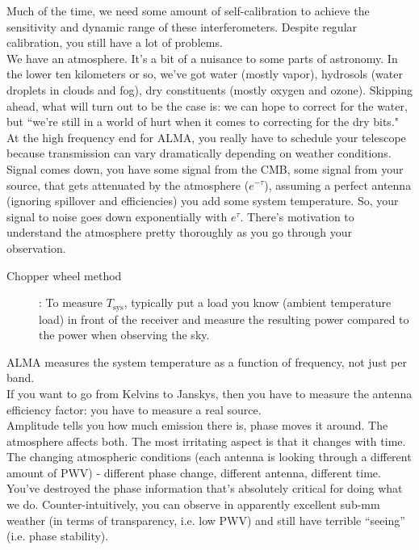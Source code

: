 \documentclass[a4paper]{article}
\begin{document}
Much of the time, we need some amount of self-calibration to achieve the sensitivity and dynamic range of these interferometers. Despite regular calibration, you still have a lot of problems. \\

We have an atmosphere. It's a bit of a nuisance to some parts of astronomy. In the lower ten kilometers or so, we've got water (mostly vapor), hydrosols (water droplets in clouds and fog), dry constituents (mostly oxygen and ozone). Skipping ahead, what will turn out to be the case is: we can hope to correct for the water, but ``we're still in a world of hurt when it comes to correcting for the dry bits." \\

At the high frequency end for ALMA, you really have to schedule your telescope because transmission can vary dramatically depending on weather conditions. \\

Signal comes down, you have some signal from the CMB, some signal from your source, that gets attenuated by the atmosphere ($e^{-\tau}$), assuming a perfect antenna (ignoring spillover and efficiencies) you add some system temperature. So, your signal to noise goes down exponentially with $e^{\tau}$. There's motivation to understand the atmosphere pretty thoroughly as you go through your observation. 

\begin{description}
\item[Chopper wheel method]: To measure $T_\mathrm{sys}$, typically put a load you know (ambient temperature load) in front of the receiver and measure the resulting power compared to the power when observing the sky. 
\end{description}

ALMA measures the system temperature as a function of frequency, not just per band. \\

If you want to go from Kelvins to Janskys, then you have to measure the antenna efficiency factor: you have to measure a real source. \\

Amplitude tells you how much emission there is, phase moves it around. The atmosphere affects both. The most irritating aspect is that it changes with time. The changing atmospheric conditions (each antenna is looking through a different amount of PWV) - different phase change, different antenna, different time. You've destroyed the phase information that's absolutely critical for doing what we do. Counter-intuitively, you can observe in apparently excellent sub-mm weather (in terms of transparency, i.e. low PWV) and still have terrible ``seeing'' (i.e. phase stability). \\
\end{document}
